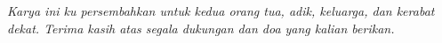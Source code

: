 \begin{center}
\emph{ Karya ini ku persembahkan untuk kedua orang tua, adik, keluarga, dan kerabat dekat. Terima kasih atas segala dukungan dan doa yang kalian berikan.}
\end{center}
